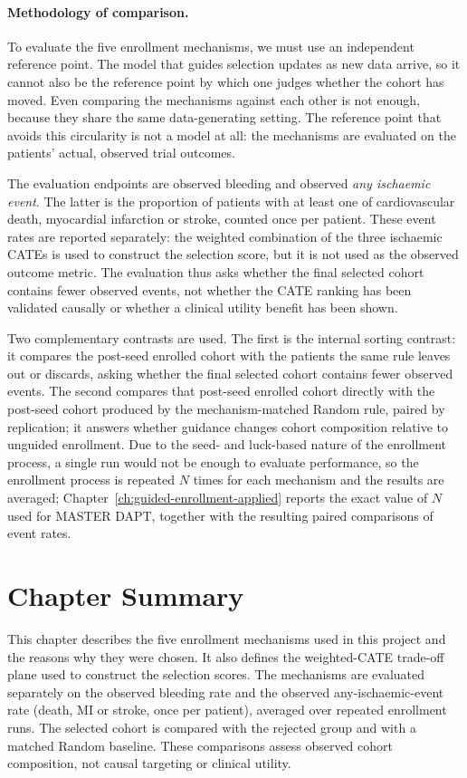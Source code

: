 \vspace{10pt}

\paragraph{Methodology of comparison.}
To evaluate the five enrollment mechanisms, we must use an independent reference point.
The model that guides selection updates as new data arrive, so it cannot also be the
reference point by which one judges whether the cohort has moved. Even comparing the
mechanisms against each other is not enough, because they share the same data-generating
setting. The reference point that avoids this circularity is not a model at all: the
mechanisms are evaluated on the patients' actual, observed trial outcomes.

The evaluation endpoints are observed bleeding and observed \emph{any ischaemic event}.
The latter is the proportion of patients with at least one of cardiovascular death,
myocardial infarction or stroke, counted once per patient. These event rates are reported
separately: the weighted combination of the three ischaemic CATEs is used to construct the
selection score, but it is not used as the observed outcome metric. The evaluation thus
asks whether the final selected cohort contains fewer observed events, not whether the
CATE ranking has been validated causally or whether a clinical utility benefit has been
shown.

Two complementary contrasts are used. The first is the internal sorting contrast: it
compares the post-seed enrolled cohort with the patients the same rule leaves out or
discards, asking whether the final selected cohort contains fewer observed events. The
second compares that post-seed enrolled cohort directly with the post-seed cohort produced
by the mechanism-matched Random rule, paired by replication; it answers whether guidance
changes cohort composition relative to unguided enrollment.
Due to the seed- and
luck-based nature of the enrollment process, a single run would not be enough to evaluate
performance, so the enrollment process is repeated $N$ times for each mechanism and the
results are averaged; Chapter~\ref{ch:guided-enrollment-applied} reports the exact value
of $N$ used for MASTER DAPT, together with the resulting paired comparisons of event
rates.

\section{Chapter Summary}
This chapter describes the five enrollment mechanisms used in this project and the
reasons why they were chosen. It also defines the weighted-CATE trade-off plane used to
construct the selection scores. The mechanisms are evaluated separately on the observed
bleeding rate and the observed any-ischaemic-event rate (death, MI or stroke, once per
patient), averaged over repeated enrollment runs. The selected cohort is compared with
the rejected group and with a matched Random baseline. These comparisons assess observed
cohort composition, not causal targeting or clinical utility.

